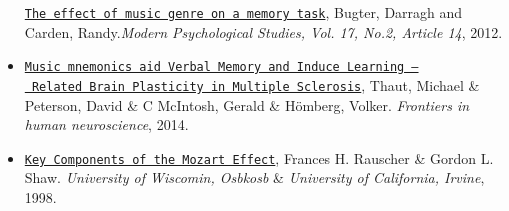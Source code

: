 \documentclass[]{article}
\begin{document}
\begin{itemize}
  \href{https://scholar.utc.edu/mps/vol17/iss2/14}{\texttt{The\ effect\ of\ music\ genre\ on\ a\ memory\ task}},
  Bugter, Darragh and Carden, Randy.\emph{Modern Psychological Studies,
  Vol. 17, No.2, Article 14}, 2012.
\item
  \href{https://www.frontiersin.org/articles/10.3389/fnhum.2014.00395/full}{\texttt{Music\ mnemonics\ aid\ Verbal\ Memory\ and\ Induce\ Learning\ –\ Related\ Brain\ Plasticity\ in\ Multiple\ Sclerosis}},
  Thaut, Michael \& Peterson, David \& C McIntosh, Gerald \& Hömberg,
  Volker. \emph{Frontiers in human neuroscience}, 2014.
\item
  \href{https://journals.sagepub.com/doi/10.2466/pms.1998.86.3.835}{\texttt{Key\ Components\ of\ the\ Mozart\ Effect}},
  Frances H. Rauscher \& Gordon L. Shaw. \emph{University of Wiscomin,
  Osbkosb} \& \emph{University of California, Irvine}, 1998.
\end{itemize}
\end{document}
